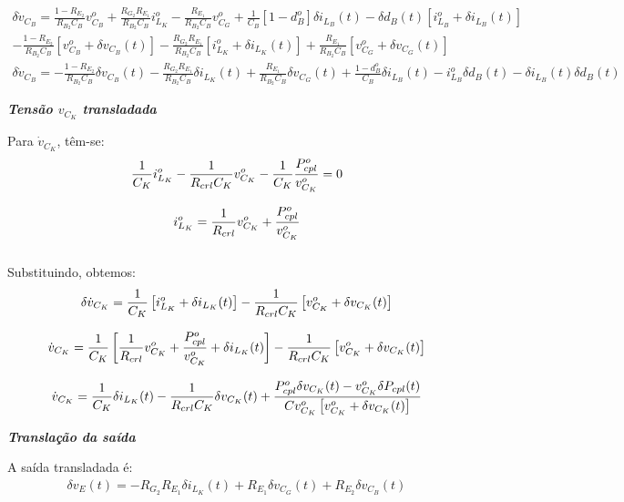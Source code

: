 \documentclass{article}
\newcommand{\nle}{%
  \notag \\[8pt]
}
\begin{document}
\begin{multline*}
  \delta \dot{v}_{C_B} = \frac{1 - R_{E_2}}{R_{B_2}C_B} v_{C_B}^o + \frac{R_{G_2} R_{E_1}}{R_{B_2}C_B} i_{L_K}^o - \frac{R_{E_1}}{R_{B_2}C_B} v_{C_G}^o
  + \frac{1}{C_B} \left[1 - d_B^o\right] \delta i_{L_B}(t)
  - \delta d_B(t) \left[i_{L_B}^o + \delta i_{L_B}(t) \right] \\
  - \frac{1 - R_{E_2}}{R_{B_2}C_B} \left[v_{C_B}^o + \delta v_{C_B}(t)\right]
  - \frac{R_{G_2} R_{E_1}}{R_{B_2} C_B} \left[i_{L_K}^o + \delta i_{L_K}(t)\right]
  + \frac{R_{E_1}}{R_{B_2} C_B} \left[v_{C_G}^o + \delta v_{C_G}(t)\right]
\end{multline*}
\begin{multline}
  \delta \dot{v}_{C_B} = - \frac{1 - R_{E_2}}{R_{B_2}C_B} \delta v_{C_B}(t)
  - \frac{R_{G_2} R_{E_1}}{R_{B_2}C_B} \delta i_{L_K}(t)
  + \frac{R_{E_1}}{R_{B_2}C_B} \delta v_{C_G}(t)
  + \frac{1 - d_B^o}{C_B} \delta i_{L_B}(t)
  - i_{L_B}^o \delta d_B(t) - \delta i_{L_B}(t) \delta d_B(t)
\end{multline}

\textbf{\textit{Tensão $v_{C_K}$ transladada}} \vspace*{12pt}

Para $\dot{v}_{C_K}$, têm-se:
\begin{gather*}
  \frac{1}{C_K} i_{L_K}^o - \frac{1}{R_{crl} C_K} v_{C_K}^o - \frac{1}{C_K} \frac{P_{cpl}^o}{v_{C_K}^o} = 0 \nle
  i_{L_K}^o = \frac{1}{R_{crl}} v_{C_K}^o + \frac{P_{cpl}^o}{v_{C_K}^o} \nle
\end{gather*}

Substituindo, obtemos:
\begin{gather*}
  \delta \dot{v}_{C_K} = \frac{1}{C_K} \left[i_{L_K}^o + \delta i_{L_K}(t)\right]
  - \frac{1}{R_{crl} C_K} \left[v_{C_K}^o + \delta v_{C_K}(t)\right] \nle
  \dot{v}_{C_K} = \frac{1}{C_K} \left[\frac{1}{R_{crl}} v_{C_K}^o + \frac{P_{cpl}^o}{v_{C_K}^o} + \delta i_{L_K}(t)\right]
  - \frac{1}{R_{crl} C_K} \left[v_{C_K}^o + \delta v_{C_K}(t)\right] \nle
  \dot{v}_{C_K} = \frac{1}{C_K} \delta i_{L_K}(t)
  - \frac{1}{R_{crl} C_K} \delta v_{C_K}(t)
  + \frac{P_{cpl}^o \delta v_{C_K}(t) - v_{C_K}^o \delta P_{cpl}(t)}{Cv_{C_K}^o\left[v_{C_K}^o + \delta v_{C_K}(t)\right]}
\end{gather*}

\textbf{\textit{Translação da saída}} \vspace*{12pt}

A saída transladada é:
\begin{gather}
  \delta v_E(t) = - R_{G_2} R_{E_1} \delta i_{L_K}(t) + R_{E_1} \delta v_{C_G}(t) + R_{E_2} \delta v_{C_B}(t)
\end{gather}
\end{document}
